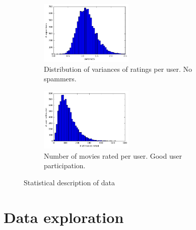 \documentclass[10pt,conference,compsocconf]{IEEEtran}
\begin{document}


\begin{figure}[tbp] %
    \centering
    \hspace{-0.6cm}
    \begin{subfigure}[t]{0.45\columnwidth}
        \centering
        \includegraphics[height=1.2in]{img/Variances}
        \vspace{-3mm}
  \caption{Distribution of variances of ratings per user. No spammers.}
  \label{variances}
    \end{subfigure}%
    \hspace{0.4cm}
    \begin{subfigure}[t]{0.45\columnwidth}
        \centering
        \includegraphics[height=1.2in]{img/Ratings}
        \vspace{-3mm}
        \caption{Number of movies rated per user. Good user participation.}
        \label{number_ratings}
    \end{subfigure}
    \caption{Statistical description of data}
\end{figure}


\section{Data exploration}
\end{document}
